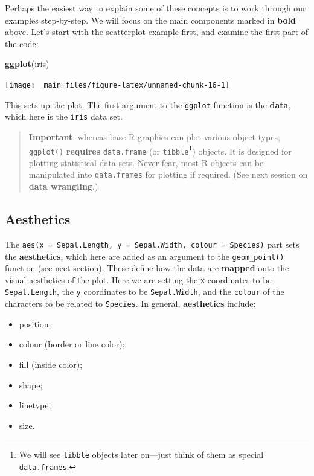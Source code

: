 \documentclass[]{book}
\newenvironment{Shaded}{\begin{snugshade}}{\end{snugshade}}
\newcommand{\KeywordTok}[1]{\textcolor[rgb]{0.13,0.29,0.53}{\textbf{{#1}}}}
\newcommand{\NormalTok}[1]{{#1}}
\providecommand{\tightlist}{%
  \setlength{\itemsep}{0pt}\setlength{\parskip}{0pt}}
\let\rmarkdownfootnote\footnote%
\def\footnote{\protect\rmarkdownfootnote}
\theoremstyle{definition}
\theoremstyle{definition}
\theoremstyle{definition}
\theoremstyle{remark}
\begin{document}
Perhaps the easiest way to explain some of these concepts is to work
through our examples step-by-step. We will focus on the main components
marked in \textbf{bold} above. Let's start with the scatterplot example
first, and examine the first part of the code:

\begin{Shaded}
\begin{Highlighting}[]
\KeywordTok{ggplot}\NormalTok{(iris)}
\end{Highlighting}
\end{Shaded}

\begin{center}\texttt{[image: \_main\_files/figure-latex/unnamed-chunk-16-1]} \end{center}

This sets up the plot. The first argument to the \texttt{ggplot}
function is the \textbf{data}, which here is the \texttt{iris} data set.

\begin{quote}
\textbf{Important}: whereas base R graphics can plot various object
types, \texttt{ggplot()} \textbf{requires} \texttt{data.frame} (or
\texttt{tibble}\footnote{We will see \texttt{tibble} objects later
  on---just think of them as special \texttt{data.frames}.}) objects. It
is designed for plotting statistical data sets. Never fear, most R
objects can be manipulated into \texttt{data.frames} for plotting if
required. (See next session on \textbf{data wrangling}.)
\end{quote}

\subsection{Aesthetics}\label{aesthetics}

The
\texttt{aes(x\ =\ Sepal.Length,\ y\ =\ Sepal.Width,\ colour\ =\ Species)}
part sets the \textbf{aesthetics}, which here are added as an argument
to the \texttt{geom\_point()} function (see nect section). These define
how the data are \textbf{mapped} onto the visual aesthetics of the plot.
Here we are setting the \texttt{x} coordinates to be
\texttt{Sepal.Length}, the \texttt{y} coordinates to be
\texttt{Sepal.Width}, and the \texttt{colour} of the characters to be
related to \texttt{Species}. In general, \textbf{aesthetics} include:

\begin{itemize}
\tightlist
\item
  position;
\item
  colour (border or line color);
\item
  fill (inside color);
\item
  shape;
\item
  linetype;
\item
  size.
\end{itemize}
\end{document}
